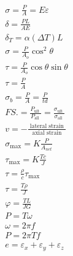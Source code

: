 \documentclass[10pt]{article}
\begin{document}
$$
\begin{aligned}
&\sigma=\frac{P}{A}=E \varepsilon \\
&\delta=\frac{P L}{A E} \\
&\delta_T=\alpha(\Delta T) L \\
&\sigma=\frac{P}{A_o} \cos ^2 \theta \\
&\tau=\frac{P}{A_o} \cos \theta \sin \theta \\
&\tau=\frac{P}{A} \\
&\sigma_b=\frac{P}{A}=\frac{P}{t d} \\
&F S .=\frac{P_{\text {ult }}}{P_{\text {all }}}=\frac{\sigma_{\text {ult }}}{\sigma_{\text {all }}} \\
&v=-\frac{\text { lateral strain }}{\text { axial strain }} \\
&\sigma_{\max }=K \frac{P}{A_{n e t}} \\
&\tau_{\max }=K \frac{T c}{J} \\
&\tau=\frac{\rho}{c} \tau_{\max } \\
&\tau=\frac{T \rho}{J} \\
&\varphi=\frac{T L}{J G} \\
&P=T \omega \\
&\omega=2 \pi f \\
&P=2 \pi T f \\
&e=\varepsilon_x+\varepsilon_y+\varepsilon_z \\
&
\end{aligned}
$$
\end{document}
